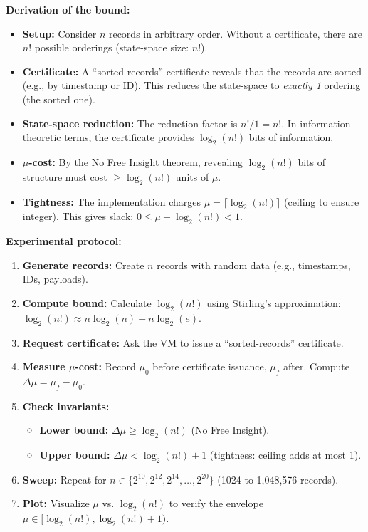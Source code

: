 \textbf{Derivation of the bound:}
\begin{itemize}
    \item \textbf{Setup:} Consider $n$ records in arbitrary order. Without a certificate, there are $n!$ possible orderings (state-space size: $n!$).
    
    \item \textbf{Certificate:} A ``sorted-records'' certificate reveals that the records are sorted (e.g., by timestamp or ID). This reduces the state-space to \textit{exactly 1} ordering (the sorted one).
    
    \item \textbf{State-space reduction:} The reduction factor is $n! / 1 = n!$. In information-theoretic terms, the certificate provides $\log_2(n!)$ bits of information.
    
    \item \textbf{$\mu$-cost:} By the No Free Insight theorem, revealing $\log_2(n!)$ bits of structure must cost $\geq \log_2(n!)$ units of $\mu$.
    
    \item \textbf{Tightness:} The implementation charges $\mu = \lceil \log_2(n!) \rceil$ (ceiling to ensure integer). This gives slack: $0 \leq \mu - \log_2(n!) < 1$.
\end{itemize}

\textbf{Experimental protocol:}
\begin{enumerate}
    \item \textbf{Generate records:} Create $n$ records with random data (e.g., timestamps, IDs, payloads).
    
    \item \textbf{Compute bound:} Calculate $\log_2(n!)$ using Stirling's approximation: $\log_2(n!) \approx n \log_2(n) - n \log_2(e)$.
    
    \item \textbf{Request certificate:} Ask the VM to issue a ``sorted-records'' certificate.
    
    \item \textbf{Measure $\mu$-cost:} Record $\mu_0$ before certificate issuance, $\mu_f$ after. Compute $\Delta\mu = \mu_f - \mu_0$.
    
    \item \textbf{Check invariants:}
    \begin{itemize}
        \item \textbf{Lower bound:} $\Delta\mu \geq \log_2(n!)$ (No Free Insight).
        \item \textbf{Upper bound:} $\Delta\mu < \log_2(n!) + 1$ (tightness: ceiling adds at most 1).
    \end{itemize}
    
    \item \textbf{Sweep:} Repeat for $n \in \{2^{10}, 2^{12}, 2^{14}, \ldots, 2^{20}\}$ (1024 to 1,048,576 records).
    
    \item \textbf{Plot:} Visualize $\mu$ vs. $\log_2(n!)$ to verify the envelope $\mu \in [\log_2(n!), \log_2(n!)+1)$.
\end{enumerate}

